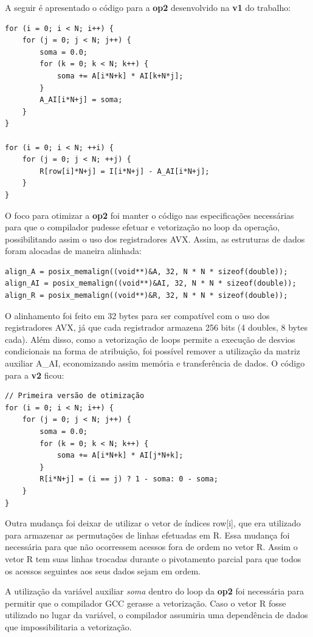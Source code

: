 \documentclass[12pt]{article}
\begin{document}
A seguir é apresentado o código para a \textbf{op2} desenvolvido na \textbf{v1} do trabalho:
\begin{lstlisting}
for (i = 0; i < N; i++) {
	for (j = 0; j < N; j++) {
		soma = 0.0;
		for (k = 0; k < N; k++) {
			soma += A[i*N+k] * AI[k+N*j];
		}
		A_AI[i*N+j] = soma;
	}
}

for (i = 0; i < N; ++i) {
	for (j = 0; j < N; ++j) {
        R[row[i]*N+j] = I[i*N+j] - A_AI[i*N+j];
	}
}
\end{lstlisting}


O foco para otimizar a \textbf{op2} foi manter o código nas especificações necessárias para que o compilador pudesse efetuar e vetorização no loop da operação, possibilitando assim o uso dos registradores AVX. Assim, as estruturas de dados foram alocadas de maneira alinhada:

\begin{lstlisting}
align_A = posix_memalign((void**)&A, 32, N * N * sizeof(double));
align_AI = posix_memalign((void**)&AI, 32, N * N * sizeof(double));
align_R = posix_memalign((void**)&R, 32, N * N * sizeof(double));
\end{lstlisting}

O alinhamento foi feito em 32 bytes para ser compatível com o uso dos registradores AVX, já que cada registrador armazena 256 bits (4 doubles, 8 bytes cada). Além disso, como a vetorização de loops permite a execução de desvios condicionais na forma de atribuição, foi possível remover a utilização da matriz auxiliar A\_AI, economizando assim memória e transferência de dados. O código para a \textbf{v2} ficou:

\begin{lstlisting}
// Primeira versão de otimização
for (i = 0; i < N; i++) {
	for (j = 0; j < N; j++) {
		soma = 0.0;
		for (k = 0; k < N; k++) {
			soma += A[i*N+k] * AI[j*N+k];
		}
		R[i*N+j] = (i == j) ? 1 - soma: 0 - soma;
	}
}
\end{lstlisting}

Outra mudança foi deixar de utilizar o vetor de índices row[i], que era utilizado para armazenar as permutações de linhas efetuadas em R. Essa mudança foi necessária para que não ocorressem acessos fora de ordem no vetor R. Assim o vetor R tem suas linhas trocadas durante o pivotamento parcial para que todos os acessos seguintes aos seus dados sejam em ordem.

A utilização da variável auxiliar \emph{soma} dentro do loop da \textbf{op2} foi necessária para permitir que o compilador GCC gerasse a vetorização. Caso o vetor R fosse utilizado no lugar da variável, o compilador assumiria uma dependência de dados que impossibilitaria a vetorização.
\end{document}
